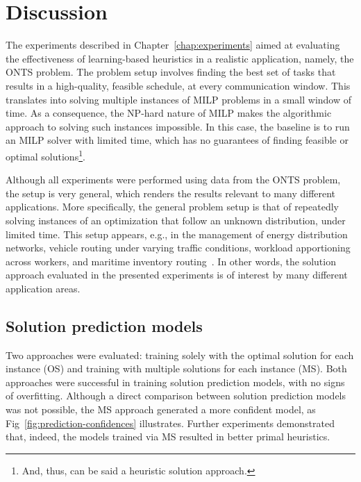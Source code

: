 

\chapter{Discussion}\label{chap:discussion}

The experiments described in Chapter~\ref{chap:experiments} aimed at evaluating the effectiveness of learning-based heuristics in a realistic application, namely, the ONTS problem.
The problem setup involves finding the best set of tasks that results in a high-quality, feasible schedule, at every communication window.
This translates into solving multiple instances of MILP problems in a small window of time.
As a consequence, the NP-hard nature of MILP makes the algorithmic approach to solving such instances impossible.
In this case, the baseline is to run an MILP solver with limited time, which has no guarantees of finding feasible or optimal solutions\footnote{And, thus, can be said a heuristic solution approach.}.

Although all experiments were performed using data from the ONTS problem, the setup is very general, which renders the results relevant to many different applications.
More specifically, the general problem setup is that of repeatedly solving instances of an optimization that follow an unknown distribution, under limited time.
This setup appears, e.g., in the management of energy distribution networks, vehicle routing under varying traffic conditions, workload apportioning across workers, and maritime inventory routing~\cite{gasseMachineLearningCombinatorial2022,papageorgiouMIRPLibLibraryMaritime2014}.
In other words, the solution approach evaluated in the presented experiments is of interest by many different application areas.

\section{Solution prediction models}

Two approaches were evaluated: training solely with the optimal solution for each instance (OS) and training with multiple solutions for each instance (MS).
Both approaches were successful in training solution prediction models, with no signs of overfitting.
Although a direct comparison between solution prediction models was not possible, the MS approach generated a more confident model, as Fig~\ref{fig:prediction-confidences} illustrates.
Further experiments demonstrated that, indeed, the models trained via MS resulted in better primal heuristics.

